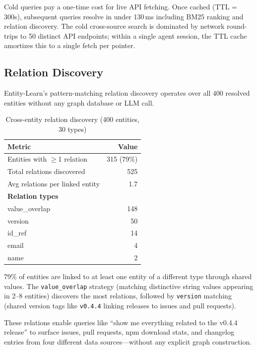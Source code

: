 \documentclass[11pt,twocolumn]{article}
\begin{document}
Cold queries pay a one-time cost for live API fetching. Once cached (TTL = 300s), subsequent queries resolve in under 130\,ms including BM25 ranking and relation discovery. The cold cross-source search is dominated by network round-trips to 50 distinct API endpoints; within a single agent session, the TTL cache amortizes this to a single fetch per pointer.

\subsection{Relation Discovery}

Entity-Learn's pattern-matching relation discovery operates over all 400 resolved entities without any graph database or LLM call.

\begin{table}[t]
\centering
\caption{Cross-entity relation discovery (400 entities, 30 types)}
\label{tab:relations}
\begin{tabular}{lr}
\toprule
\textbf{Metric} & \textbf{Value} \\
\midrule
Entities with $\geq$1 relation & 315 (79\%) \\
Total relations discovered & 525 \\
Avg relations per linked entity & 1.7 \\
\midrule
\multicolumn{2}{l}{\textbf{Relation types}} \\
\quad value\_overlap & 148 \\
\quad version & 50 \\
\quad id\_ref & 14 \\
\quad email & 4 \\
\quad name & 2 \\
\bottomrule
\end{tabular}
\end{table}

79\% of entities are linked to at least one entity of a different type through shared values. The \texttt{value\_overlap} strategy (matching distinctive string values appearing in 2--8 entities) discovers the most relations, followed by \texttt{version} matching (shared version tags like \texttt{v0.4.4} linking releases to issues and pull requests).

These relations enable queries like ``show me everything related to the v0.4.4 release'' to surface issues, pull requests, npm download stats, and changelog entries from four different data sources---without any explicit graph construction.
\end{document}
